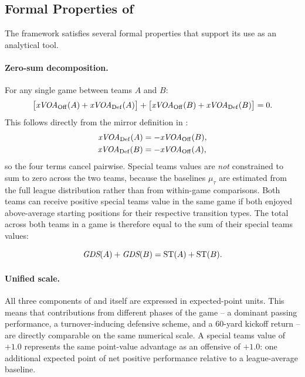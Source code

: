 \subsection{Formal Properties of \gds{}}
\label{sec:gds-properties}

The \gds{} framework satisfies several formal properties that support its
use as an analytical tool.

\paragraph{Zero-sum decomposition.}
For any single game between teams $A$ and $B$:
\begin{equation}
  \label{eq:zero-sum}
  \bigl[\textit{xVOA}{}_{\mathrm{Off}}(A) + \textit{xVOA}{}_{\mathrm{Def}}(A)\bigr]
  +
  \bigl[\textit{xVOA}{}_{\mathrm{Off}}(B) + \textit{xVOA}{}_{\mathrm{Def}}(B)\bigr]
  = 0.
\end{equation}
This follows directly from the mirror definition in :
\begin{align*}
  \textit{xVOA}{}_{\mathrm{Def}}(A) &= -\textit{xVOA}{}_{\mathrm{Off}}(B), \\
  \textit{xVOA}{}_{\mathrm{Def}}(B) &= -\textit{xVOA}{}_{\mathrm{Off}}(A),
\end{align*}
so the four terms cancel pairwise. Special teams values are \emph{not} constrained to sum to
zero across the two teams, because the baselines $\mu_\tau$ are estimated
from the full league distribution rather than from within-game comparisons.
Both teams can receive positive special teams value in the same game if both
enjoyed above-average starting positions for their respective transition types.
The total \gds{} across both teams in a game is therefore equal to the sum of
their special teams values:

\begin{equation}
  \textit{GDS}(A) + \textit{GDS}(B) = \mathrm{ST}(A) + \mathrm{ST}(B).
\end{equation}

\paragraph{Unified scale.}
All three components of \gds{} and \gds{} itself are expressed in
expected-point units. This means that contributions from different phases of
the game -- a dominant passing performance, a turnover-inducing defensive
scheme, and a 60-yard kickoff return -- are directly comparable on the same
numerical scale. A special teams value of $+1.0$ represents the same
point-value advantage as an offensive \xvoa{} of $+1.0$: one additional
expected point of net positive performance relative to a league-average
baseline.

